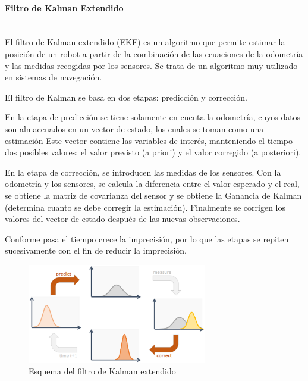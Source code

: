 \paragraph{Filtro de Kalman Extendido} \hspace{0pt} \\
El filtro de Kalman extendido (EKF) es un algoritmo que permite estimar la
posición de un robot a partir de la combinación de las ecuaciones de la
odometría y las medidas recogidas por los sensores. Se trata de un algoritmo muy
utilizado en sistemas de navegación.

El filtro de Kalman se basa en dos etapas: predicción y corrección.

En la etapa de predicción se tiene solamente en cuenta la odometría, cuyos datos
son almacenados en un vector de estado, los cuales se toman como una estimación
Este vector contiene las variables de interés, manteniendo el tiempo dos
posibles valores: el valor previsto (a priori) y el valor corregido (a
posteriori).

En la etapa de corrección, se introducen las medidas de los sensores. Con  la
odometría y los sensores, se calcula la diferencia entre el valor esperado y el
real, se obtiene la matriz de covarianza del sensor y se obtiene la Ganancia de
Kalman (determina cuanto se debe corregir la estimación). Finalmente se corrigen
los valores del vector de estado después de las nuevas observaciones.

Conforme pasa el tiempo crece la imprecisión, por lo que las etapas se repiten
sucesivamente con el fin de reducir la imprecisión.

\begin{figure}[!th]
  \begin{center}
    \includegraphics[width=0.7\textwidth]{images/cap2/Kalman.eps}
    \caption{Esquema del filtro de Kalman extendido}
    \label{fig:Kalman}
  \end{center}
\end{figure}

